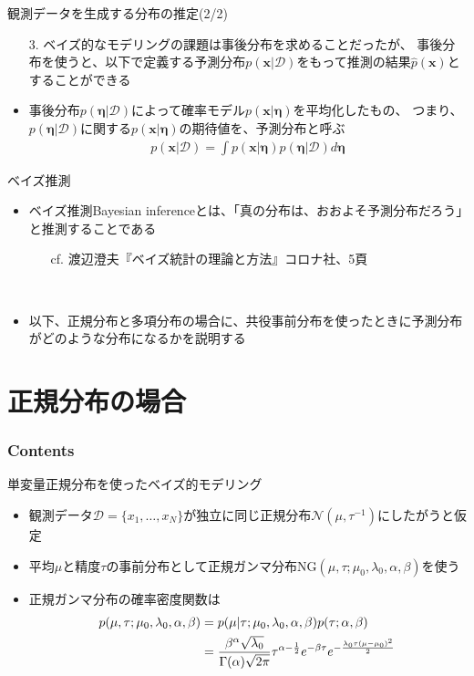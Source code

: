 \documentclass[aspectratio=169,unicode,dvipdfmx,14pt]{beamer}
\begin{document}
\begin{frame}{観測データを生成する分布の推定(2/2)}
\begin{itemize}
\item[3.] ベイズ的なモデリングの課題は事後分布を求めることだったが、
事後分布を使うと、以下で定義する予測分布$p(\bm{x}|\mathcal{D})$をもって推測の結果$\hat{p}(\bm{x})$とすることができる
\item 事後分布$p(\bm{\eta} | \mathcal{D})$によって確率モデル$p(\bm{x}|\bm{\eta})$を平均化したもの、
つまり、$p(\bm{\eta} | \mathcal{D})$に関する$p(\bm{x}|\bm{\eta})$の期待値を、予測分布と呼ぶ
\begin{align}
p(\bm{x}|\mathcal{D}) = \int p(\bm{x}|\bm{\eta}) p(\bm{\eta} | \mathcal{D}) d\bm{\eta}
\label{eq:predictive}
\end{align}
\end{itemize}
\end{frame}

\begin{frame}{ベイズ推測}
\begin{itemize}
\item ベイズ推測Bayesian inferenceとは、「真の分布は、おおよそ予測分布だろう」と推測することである
\begin{itemize}
\item[cf.] 渡辺澄夫『ベイズ統計の理論と方法』コロナ社、5頁
\end{itemize}
\item[] \ 
\item 以下、正規分布と多項分布の場合に、共役事前分布を使ったときに予測分布がどのような分布になるかを説明する
\end{itemize}
\end{frame}

\section{正規分布の場合}

\begin{frame}\frametitle{Contents}
\Large \tableofcontents[currentsection]
\end{frame}

\begin{frame}{単変量正規分布を使ったベイズ的モデリング}
\begin{itemize}
\item 観測データ$\mathcal{D}=\{x_1,\ldots,x_N\}$が独立に同じ正規分布$\mathcal{N}(\mu,\tau^{-1})$にしたがうと仮定
\item 平均$\mu$と精度$\tau$の事前分布として正規ガンマ分布$\mbox{NG}(\mu,\tau;\mu_0, \lambda_0, \alpha, \beta)$を使う
\item 正規ガンマ分布の確率密度関数は
\begin{align}
p(\mu, \tau ; \mu_0, \lambda_0, \alpha, \beta)
& = p(\mu | \tau ; \mu_0, \lambda_0, \alpha, \beta) p(\tau ; \alpha, \beta)
\notag \\ &
= \frac{\beta^\alpha\sqrt{\lambda_0}}{\Gamma(\alpha)\sqrt{2\pi}}
\tau^{\alpha-\frac{1}{2}}e^{-\beta\tau}e^{-\frac{\lambda_0\tau(\mu - \mu_0)^2}{2}}
\end{align}
\end{itemize}
\end{frame}
\end{document}

